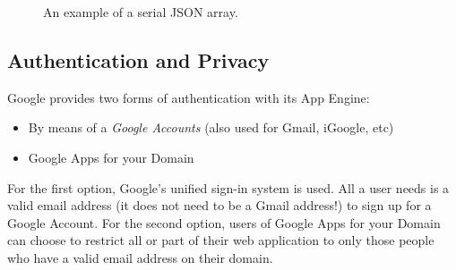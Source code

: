 \begin{figure}[ht] %
\begin{center}
\begin{code}
["/home/bboterm/app-engine/",{"key1":"value1","key2":"value2","key3":"value3"},
  "R0lGODlh(...)KSAAOw=="]
\end{code}
\caption{An example of a serial JSON array.\label{serverdesign-json-string}}
\end{center}
\end{figure}

% 
% 
% 
 
\subsection{Authentication and Privacy}
\label{serverdesign-auth}
Google provides two forms of authentication with its App Engine:

\begin{itemize}
\item By means of a \emph{Google Accounts} (also used for Gmail, iGoogle, etc)
\item Google Apps for your Domain
\end{itemize}

For the first option, Google's unified sign-in system is used. All a user needs
is a valid email address (it does not need to be a Gmail address!) to sign up
for a Google Account. For the second option, users of Google Apps for your Domain can
choose to restrict all or part of their web application to only those people who
have a valid email address on their domain.

